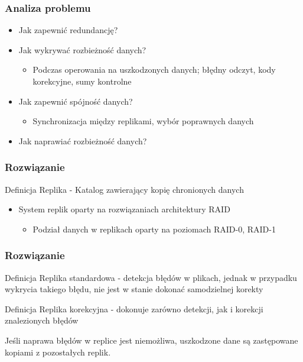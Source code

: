 \documentclass{beamer}
\begin{document}
	\begin{frame}
		\frametitle{Analiza problemu}

		\begin{itemize}
			\item Jak zapewnić redundancję?
			\pause 
		    \item Jak wykrywać rozbieżność danych?
			    \begin{itemize}
				    \item Podczas operowania na uszkodzonych danych; błędny odczyt, kody korekcyjne, sumy kontrolne 
			    \end{itemize}
            \item Jak zapewnić spójność danych?
			\pause
            \begin{itemize}
				\item Synchronizacja między replikami, wybór poprawnych danych
			\end{itemize}
		    \pause
			\item Jak naprawiać rozbieżność danych?
			
		\end{itemize}
	\end{frame}
		
	\begin{frame}
		\frametitle{Rozwiązanie}
			\begin{block}{Definicja}
				Replika - Katalog zawierający kopię chronionych danych
			\end{block}
			\begin{itemize}
				\item System replik oparty na rozwiązaniach architektury RAID
				\begin{itemize}
					\item Podział danych w replikach oparty na poziomach RAID-0, RAID-1
				\end{itemize}
			\end{itemize}
			
	\end{frame}

		
\begin{frame}
	\frametitle{Rozwiązanie}
	\begin{block}{Definicja}
	    Replika standardowa - detekcja błędów w plikach, jednak w przypadku wykrycia takiego błędu, nie jest w stanie dokonać samodzielnej korekty
    \end{block}
	\begin{block}{Definicja}
        Replika korekcyjna - dokonuje zarówno detekcji, jak i korekcji znalezionych błędów
    \end{block}
    Jeśli naprawa błędów w replice jest niemożliwa, uszkodzone dane są zastępowane kopiami z pozostałych replik.
\end{frame}
\end{document}
